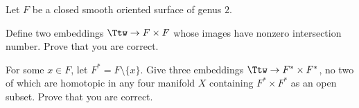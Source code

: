 Let $F$ be a closed smooth oriented surface of genus $2$. 
\begin{alist}
\item Define two embeddings $\Ttw\rightarrow F\times F$ whose images
have nonzero intersection number. Prove that you are correct.
\item For some $x\in F$, let $F^*=F\setminus \{x\}$. Give three
embeddings $\Ttw\rightarrow F^*\times F^*$, no two of which are
homotopic in any four manifold $X$ containing $F^*\times F^*$ as
an open subset. Prove that you are correct.
\end{alist}
